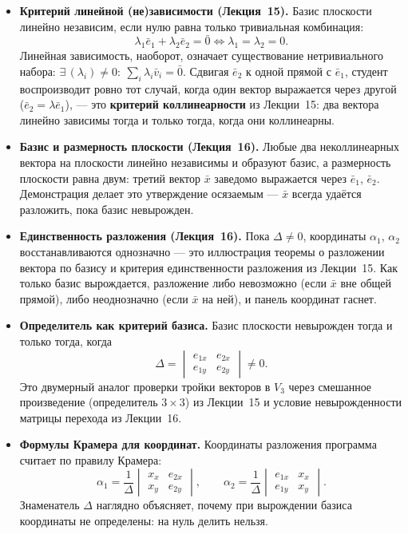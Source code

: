 \begin{itemize}
  \item \textbf{Критерий линейной (не)зависимости (Лекция~15).} Базис
    плоскости линейно независим, если нулю равна только тривиальная
    комбинация:
    \[
      \lambda_1 \bar{e}_1 + \lambda_2 \bar{e}_2 = \bar 0
      \iff \lambda_1 = \lambda_2 = 0.
    \]
    Линейная зависимость, наоборот, означает существование
    нетривиального набора: $\exists\,(\lambda_i) \neq 0:\
    \sum_i \lambda_i \bar v_i = \bar 0$. Сдвигая $\bar{e}_2$ к одной
    прямой с $\bar{e}_1$, студент воспроизводит ровно тот случай, когда
    один вектор выражается через другой ($\bar{e}_2 = \lambda\bar{e}_1$),
    --- это \textbf{критерий коллинеарности} из Лекции~15: два вектора
    линейно зависимы тогда и только тогда, когда они коллинеарны.

  \item \textbf{Базис и размерность плоскости (Лекция~16).} Любые два
    неколлинеарных вектора на плоскости линейно независимы и образуют
    базис, а размерность плоскости равна двум: третий вектор $\bar{x}$
    заведомо выражается через $\bar{e}_1$, $\bar{e}_2$. Демонстрация
    делает это утверждение осязаемым --- $\bar{x}$ всегда удаётся
    разложить, пока базис невырожден.

  \item \textbf{Единственность разложения (Лекция~16).} Пока $\Delta\neq
    0$, координаты $\alpha_1$, $\alpha_2$ восстанавливаются однозначно ---
    это иллюстрация теоремы о разложении вектора по базису и критерия
    единственности разложения из Лекции~15. Как только базис вырождается,
    разложение либо невозможно (если $\bar{x}$ вне общей прямой), либо
    неоднозначно (если $\bar{x}$ на ней), и панель координат гаснет.

  \item \textbf{Определитель как критерий базиса.} Базис плоскости
    невырожден тогда и только тогда, когда
    \[
      \Delta =
      \begin{vmatrix}
        e_{1x} & e_{2x} \\
        e_{1y} & e_{2y}
      \end{vmatrix} \neq 0.
    \]
    Это двумерный аналог проверки тройки векторов в $V_3$ через
    смешанное произведение (определитель $3\times 3$) из Лекции~15 и
    условие невырожденности матрицы перехода из Лекции~16.

  \item \textbf{Формулы Крамера для координат.} Координаты разложения
    программа считает по правилу Крамера:
    \[
      \alpha_1 = \frac{1}{\Delta}
      \begin{vmatrix}
        x_x & e_{2x} \\
        x_y & e_{2y}
      \end{vmatrix},
      \qquad
      \alpha_2 = \frac{1}{\Delta}
      \begin{vmatrix}
        e_{1x} & x_x \\
        e_{1y} & x_y
      \end{vmatrix}.
    \]
    Знаменатель $\Delta$ наглядно объясняет, почему при вырождении базиса
    координаты не определены: на нуль делить нельзя.
\end{itemize}

